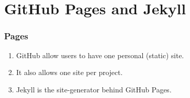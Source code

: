 
\section[GitHub Pages]{GitHub Pages and Jekyll}

\begin{frame}
\frametitle{Pages}
\begin{enumerate}
\item GitHub allow users to have one personal (static) site.
\vspace{1mm}
\item It also allows one site per project.
\vspace{1mm}
\item Jekyll is the site-generator behind GitHub Pages.
\end{enumerate}
\end{frame}
